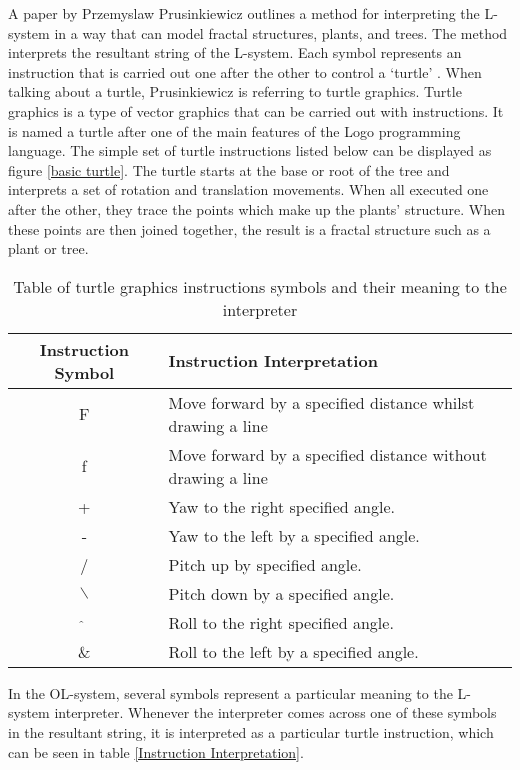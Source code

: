 A paper by Przemyslaw Prusinkiewicz outlines a method for interpreting the L-system in a way that can model fractal structures, plants, and trees. The method interprets the resultant string of the L-system. Each symbol represents an instruction that is carried out one after the other to control a `turtle' \cite{prusinkiewicz1986graphical}. When talking about a turtle, Prusinkiewicz is referring to turtle graphics. Turtle graphics is a type of vector graphics that can be carried out with instructions. It is named a turtle after one of the main features of the Logo programming language. The simple set of turtle instructions listed below can be displayed as figure \ref{basic turtle}. The turtle starts at the base or root of the tree and interprets a set of rotation and translation movements. When all executed one after the other, they trace the points which make up the plants' structure. When these points are then joined together, the result is a fractal structure such as a plant or tree.

\begin{table}[h!]
\centering
\begin{tabular}{ | c | l | }
\hline
	Instruction Symbol 	& Instruction Interpretation \\  
\hline
\hline
	F 					& Move forward by a specified distance whilst drawing a line\\
\hline
	f 					& Move forward by a specified distance without drawing a line\\
\hline
	+ 					& Yaw to the right specified angle.\\
\hline
	- 					& Yaw to the left by a specified angle.\\
\hline
	/ 					& Pitch up by specified angle. \\
\hline
	$\backslash$ 		& Pitch down by a specified angle.\\
\hline
	$\hat{}$ 			& Roll to the right specified angle.\\
\hline
	\& 					& Roll to the left by a specified angle.\\
\hline
\end{tabular}
\caption{Table of turtle graphics instructions symbols and their meaning to the interpreter}
\label{DOL-system instructions}
\end{table}
\FloatBarrier

\noindent
In the OL-system, several symbols represent a particular meaning to the L-system interpreter. Whenever the interpreter comes across one of these symbols in the resultant string, it is interpreted as a particular turtle instruction, which can be seen in table \ref{Instruction Interpretation}.

